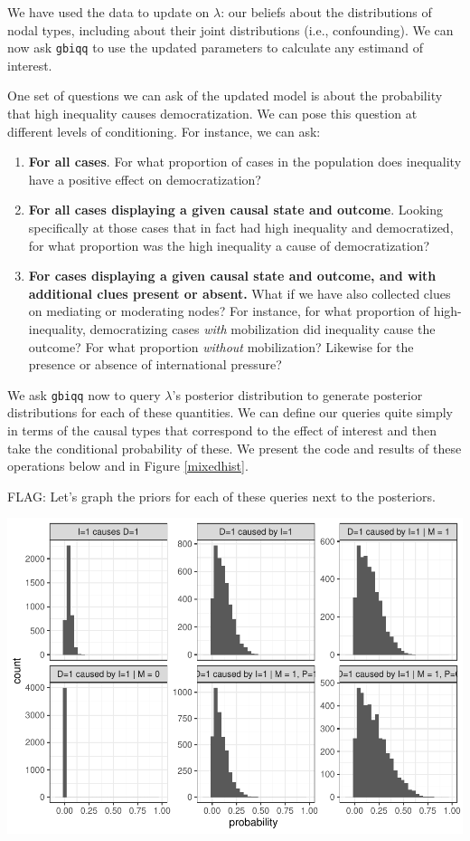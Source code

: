 \documentclass[12pt,]{book}
\begin{document}
We have used the data to update on \(\lambda\): our beliefs about the distributions of nodal types, including about their joint distributions (i.e., confounding). We can now ask \texttt{gbiqq} to use the updated parameters to calculate any estimand of interest.

One set of questions we can ask of the updated model is about the probability that high inequality causes democratization. We can pose this question at different levels of conditioning. For instance, we can ask:

\begin{enumerate}
\def\labelenumi{\arabic{enumi}.}
\item
  \textbf{For all cases}. For what proportion of cases in the population does inequality have a positive effect on democratization?
\item
  \textbf{For all cases displaying a given causal state and outcome}. Looking specifically at those cases that in fact had high inequality and democratized, for what proportion was the high inequality a cause of democratization?
\item
  \textbf{For cases displaying a given causal state and outcome, and with additional clues present or absent.} What if we have also collected clues on mediating or moderating nodes? For instance, for what proportion of high-inequality, democratizing cases \emph{with} mobilization did inequality cause the outcome? For what proportion \emph{without} mobilization? Likewise for the presence or absence of international pressure?
\end{enumerate}

We ask \texttt{gbiqq} now to query \(\lambda\)'s posterior distribution to generate posterior distributions for each of these quantities. We can define our queries quite simply in terms of the causal types that correspond to the effect of interest and then take the conditional probability of these. We present the code and results of these operations below and in Figure \ref{mixedhist}.

FLAG: Let's graph the priors for each of these queries next to the posteriors.

\includegraphics{ii_files/figure-latex/mixedhist-1.pdf}
\end{document}

